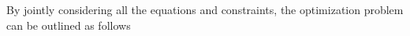 By jointly considering all the equations and constraints, the optimization problem can be outlined as follows
